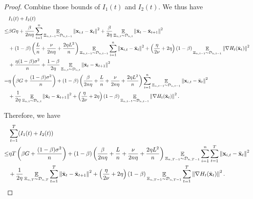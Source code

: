 \documentclass{article}
\begin{document}
\begin{proof}
Combine those bounds of $I_1(t)$ and $I_2(t)$. We thus have
\begin{align}
\nonumber
& I_1(t) + I_2(t) \\ \nonumber 
\le & \beta G \eta + \frac{\beta}{2n\eta }\sum_{i=1}^n \mathop{\mathbb{E}}_{ \Xi_{n,t-1} \sim \mathcal{D}_{n,t-1} }\left\lVert{\bf x}_{i,t} - \bar{{\bf x}}_t\right\rVert^2 + \frac{\beta }{2\eta } \mathop{\mathbb{E}}_{ \Xi_{n,t} \sim \mathcal{D}_{n,t} }\left\lVert\bar{{\bf x}}_t - \bar{{\bf x}}_{t+1}\right\rVert^2 \\ \nonumber
& + (1-\beta)\left(  \frac{L}{n} + \frac{\nu}{2n\eta} + \frac{2\eta L^2}{n}  \right)\mathop{\mathbb{E}}_{ \Xi_{n,t-1} \sim \mathcal{D}_{n,t-1} }\sum_{i=1}^n\left\lVert{\bf x}_{i,t} - \bar{{\bf x}}_t \right\rVert^2   + \left(  \frac{\eta}{2\nu} + 2\eta  \right)(1-\beta)\mathop{\mathbb{E}}_{ \Xi_{n,t-1} \sim \mathcal{D}_{n,t-1} }\left\lVert\nabla H_t(\bar{{\bf x}}_t)\right\rVert^2 \\ \nonumber 
&+ \frac{\eta (1-\beta)\sigma^2}{n} +  \frac{1-\beta}{2\eta} \mathop{\mathbb{E}}_{ \Xi_{n,t} \sim \mathcal{D}_{n,t} }\left\lVert \bar{{\bf x}}_t - \bar{{\bf x}}_{t+1}\right\rVert^2 \\ \nonumber
= & \eta\left(  \beta G + \frac{(1-\beta)\sigma^2}{n} \right) + (1-\beta)\left( \frac{\beta}{2n\eta } +\frac{L}{n} + \frac{\nu}{2n\eta} + \frac{2\eta L^2}{n}  \right)\sum_{i=1}^n \mathop{\mathbb{E}}_{ \Xi_{n,t-1} \sim \mathcal{D}_{n,t-1} }\left\lVert{\bf x}_{i,t} - \bar{{\bf x}}_t\right\rVert^2 \\ \nonumber
& + \frac{1}{2\eta } \mathop{\mathbb{E}}_{ \Xi_{n,t} \sim \mathcal{D}_{n,t} }\left\lVert\bar{{\bf x}}_t - \bar{{\bf x}}_{t+1}\right\rVert^2  + \left(  \frac{\eta}{2\nu} + 2\eta  \right)(1-\beta)\mathop{\mathbb{E}}_{ \Xi_{n,t-1} \sim \mathcal{D}_{n,t-1} }\left\lVert\nabla H_t(\bar{{\bf x}}_t)\right\rVert^2. 
\end{align}

Therefore, we have 
\begin{align}
\nonumber
&\sum_{t=1}^T (I_1(t) + I_2(t)) \\ \nonumber
\le & \eta T \left(  \beta G + \frac{(1-\beta)\sigma^2}{n} \right) + (1-\beta)\left( \frac{\beta}{2n\eta } +\frac{L}{n} + \frac{\nu}{2n\eta} + \frac{2\eta L^2}{n}  \right) \mathop{\mathbb{E}}_{ \Xi_{n,T-1} \sim \mathcal{D}_{n,T-1} }\sum_{i=1}^n \sum_{t=1}^T \left\lVert{\bf x}_{i,t} - \bar{{\bf x}}_t\right\rVert^2  \\ \nonumber
& + \frac{1}{2\eta } \mathop{\mathbb{E}}_{ \Xi_{n,T} \sim \mathcal{D}_{n,T} }\sum_{t=1}^T \left\lVert\bar{{\bf x}}_t - \bar{{\bf x}}_{t+1}\right\rVert^2 + \left(  \frac{\eta}{2\nu} + 2\eta  \right)(1-\beta)\mathop{\mathbb{E}}_{ \Xi_{n,T-1} \sim \mathcal{D}_{n,T-1} }\sum_{t=1}^T\left\lVert\nabla H_t(\bar{{\bf x}}_t)\right\rVert^2.
\end{align} 





\end{proof}
\end{document}
